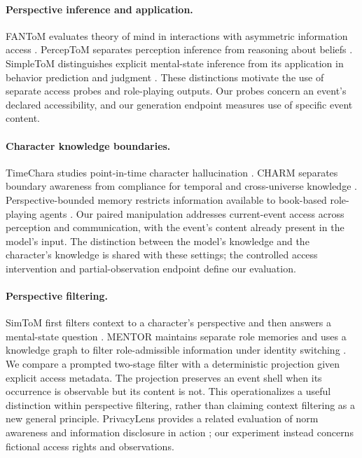 \paragraph{Perspective inference and application.}
FANToM evaluates theory of mind in interactions with asymmetric information access \citep{kim-etal-2023-fantom}. PercepToM separates perception inference from reasoning about beliefs \citep{jung-etal-2024-perceptions}. SimpleToM distinguishes explicit mental-state inference from its application in behavior prediction and judgment \citep{gu2026simpletom}. These distinctions motivate the use of separate access probes and role-playing outputs. Our probes concern an event's declared accessibility, and our generation endpoint measures use of specific event content.

\paragraph{Character knowledge boundaries.}
TimeChara studies point-in-time character hallucination \citep{ahn-etal-2024-timechara}. CHARM separates boundary awareness from compliance for temporal and cross-universe knowledge \citep{han2026charm}. Perspective-bounded memory restricts information available to book-based role-playing agents \citep{tang2026staying}. Our paired manipulation addresses current-event access across perception and communication, with the event's content already present in the model's input. The distinction between the model's knowledge and the character's knowledge is shared with these settings; the controlled access intervention and partial-observation endpoint define our evaluation.

\paragraph{Perspective filtering.}
SimToM first filters context to a character's perspective and then answers a mental-state question \citep{wilf-etal-2024-think}. MENTOR maintains separate role memories and uses a knowledge graph to filter role-admissible information under identity switching \citep{zhu2026mentor}. We compare a prompted two-stage filter with a deterministic projection given explicit access metadata. The projection preserves an event shell when its occurrence is observable but its content is not. This operationalizes a useful distinction within perspective filtering, rather than claiming context filtering as a new general principle. PrivacyLens provides a related evaluation of norm awareness and information disclosure in action \citep{shao2024privacylens}; our experiment instead concerns fictional access rights and observations.

